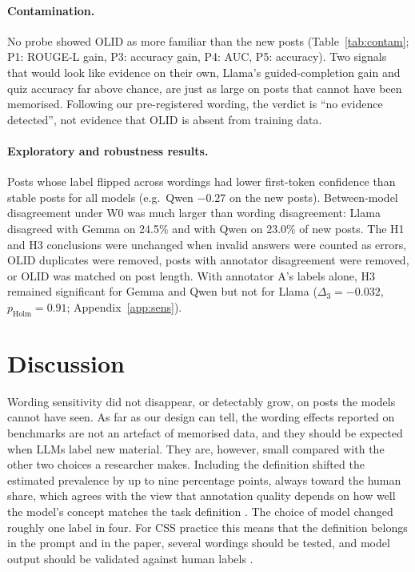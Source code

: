 \documentclass[11pt]{article}
\begin{document}
\paragraph{Contamination.} No probe showed OLID as more familiar than the new posts (Table~\ref{tab:contam}; P1: ROUGE-L gain, P3: accuracy gain, P4: AUC, P5: accuracy). Two signals that would look like evidence on their own, Llama's guided-completion gain and quiz accuracy far above chance, are just as large on posts that cannot have been memorised. Following our pre-registered wording, the verdict is ``no evidence detected'', not evidence that OLID is absent from training data.

\paragraph{Exploratory and robustness results.} Posts whose label flipped across wordings had lower first-token confidence than stable posts for all models (e.g.\ Qwen $-0.27$ on the new posts). Between-model disagreement under W0 was much larger than wording disagreement: Llama disagreed with Gemma on 24.5\% and with Qwen on 23.0\% of new posts. The H1 and H3 conclusions were unchanged when invalid answers were counted as errors, OLID duplicates were removed, posts with annotator disagreement were removed, or OLID was matched on post length. With annotator A's labels alone, H3 remained significant for Gemma and Qwen but not for Llama ($\Delta_3 = -0.032$, $p_{\text{Holm}} = 0.91$; Appendix~\ref{app:sens}).

\section{Discussion}

Wording sensitivity did not disappear, or detectably grow, on posts the models cannot have seen. As far as our design can tell, the wording effects reported on benchmarks are not an artefact of memorised data, and they should be expected when LLMs label new material. They are, however, small compared with the other two choices a researcher makes. Including the definition shifted the estimated prevalence by up to nine percentage points, always toward the human share, which agrees with the view that annotation quality depends on how well the model's concept matches the task definition \citep{casanova2026limits,atreja2025prompt}. The choice of model changed roughly one label in four. For CSS practice this means that the definition belongs in the prompt and in the paper, several wordings should be tested, and model output should be validated against human labels \citep{pangakis2023automated}.
\end{document}
